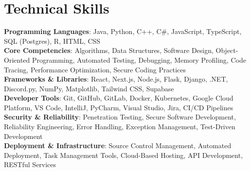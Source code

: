 \documentclass[letterpaper,11pt]{article}
\begin{document}
%
\section{Technical Skills}
 \begin{itemize}[leftmargin=0.15in, label={}]
    \small{\item{
     \textbf{Programming Languages}{: Java, Python, C++, C\#, JavaScript, TypeScript, SQL (Postgres), R, HTML, CSS} \\
     \textbf{Core Competencies}{: Algorithms, Data Structures, Software Design, Object-Oriented Programming, Automated Testing, Debugging, Memory Profiling, Code Tracing, Performance Optimization, Secure Coding Practices} \\
     \textbf{Frameworks \& Libraries}{: React, Next.js, Node.js, Flask, Django, .NET, Discord.py, NumPy, Matplotlib, Tailwind CSS, Supabase} \\
     \textbf{Developer Tools}{: Git, GitHub, GitLab, Docker, Kubernetes, Google Cloud Platform, VS Code, IntelliJ, PyCharm, Visual Studio, Jira, CI/CD Pipelines} \\
     \textbf{Security \& Reliability}{: Penetration Testing, Secure Software Development, Reliability Engineering, Error Handling, Exception Management, Test-Driven Development} \\
     \textbf{Deployment \& Infrastructure}{: Source Control Management, Automated Deployment, Task Management Tools, Cloud-Based Hosting, API Development, RESTful Services}
    }}
 \end{itemize}


\end{document}
